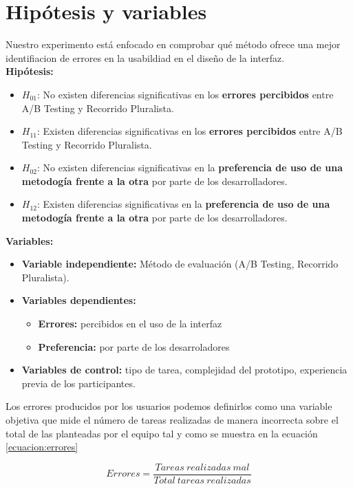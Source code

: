 \documentclass[a4paper,12pt]{report}
\begin{document}
\section{Hipótesis y variables}

Nuestro experimento está enfocado en comprobar qué método ofrece una mejor identifiacion de errores en la usabildiad en el diseño de la interfaz. \\
\vspace{0.1cm}
\textbf{Hipótesis:}
\begin{itemize}
    \item $H_{01}$: No existen diferencias significativas en los \textbf{errores percibidos} entre A/B Testing y Recorrido Pluralista.  
    \item $H_{11}$: Existen diferencias significativas en los \textbf{errores percibidos} entre A/B Testing y Recorrido Pluralista.
        \item $H_{02}$: No existen diferencias significativas en la \textbf{preferencia de uso de una metodogía frente a la otra} por parte de los desarrolladores.  
    \item $H_{12}$: Existen diferencias significativas en la \textbf{preferencia de uso de una metodogía frente a la otra} por parte de los desarrolladores.
\end{itemize}

\textbf{Variables:}
\begin{itemize}
    \item \textbf{Variable independiente:} Método de evaluación (A/B Testing, Recorrido Pluralista).
    \item \textbf{Variables dependientes:}
    \begin{itemize}
        \item \textbf{Errores:} percibidos en el uso de la interfaz
        \item \textbf{Preferencia:} por parte de los desarroladores
    \end{itemize}
    \item \textbf{Variables de control:} tipo de tarea, complejidad del prototipo, experiencia previa de los participantes.
\end{itemize}

Los errores producidos por los usuarios podemos definirlos como una variable objetiva que mide el número de tareas realizadas de manera incorrecta sobre el total de las planteadas por el equipo tal y como se muestra en la ecuación \ref{ecuacion:errores}

\begin{equation}
Errores = \frac{Tareas\ realizadas\ mal}{Total\ tareas\ realizadas}
\label{ecuacion:errores}
\end{equation}
\end{document}
